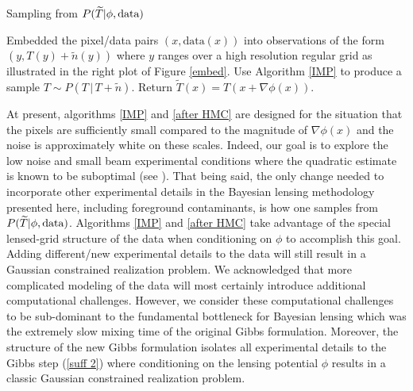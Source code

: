 \documentclass[iop,revtex4,apj,onecolumn]{emulateapj}
\begin{document}
\begin{algorithm}[H]
\small
\caption{Sampling from $P(\widetilde T |  \phi,\text{\rm data})$}
\label{after HMC}
\begin{algorithmic}[1]
\State Embedded the  pixel/data pairs  $(x, \text{data}(x))$ into observations of the form $(y, T(y)+\tilde n(y))$ where $y$ ranges over a high resolution regular grid as illustrated in the right plot of Figure \ref{embed}.
\State Use Algorithm \ref{IMP} to produce a sample $T\sim P(T\,|\, T+\tilde n)$.
\State Return $\widetilde T(x) = T(x+\nabla\phi(x))$.
\end{algorithmic}
\end{algorithm}




At present, algorithms \ref{IMP} and \ref{after HMC} are designed for the situation that the pixels are sufficiently small compared to the magnitude of $\nabla \phi(x)$ and the noise is approximately white on these scales. 
Indeed, our goal is to explore the low noise and small beam experimental conditions where the quadratic estimate is known to be suboptimal (see \cite{HirataSeljak1, HirataSeljak2}). 
That being said, the only change needed to incorporate other experimental details in the Bayesian lensing methodology presented here, including foreground contaminants, is how one samples from $P(\widetilde T |  \phi,\text{\rm data})$. Algorithms \ref{IMP} and \ref{after HMC} take advantage of the special lensed-grid structure of the data when conditioning on $\phi$ to accomplish this goal. Adding different/new experimental details to the data will still result in a Gaussian constrained realization problem. We acknowledged that more complicated modeling of the data will most certainly introduce additional computational challenges. However, we consider these computational challenges to be sub-dominant to the fundamental bottleneck for Bayesian lensing which was the extremely slow mixing time of the original Gibbs formulation. Moreover, the structure of the new Gibbs formulation isolates all experimental details to the Gibbs step (\ref{suff 2}) where conditioning on the lensing potential $\phi$ results in a classic Gaussian constrained realization problem. 
\end{document}
